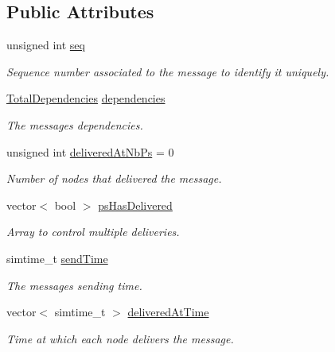\subsection*{Public Attributes}
\begin{DoxyCompactItemize}
\item 
unsigned int \hyperlink{structs__msg_a81ee20a1e6b791fdc215d88c0418e618}{seq}
\begin{DoxyCompactList}\small\item\em Sequence number associated to the message to identify it uniquely. \end{DoxyCompactList}\item 
\hyperlink{class_total_dependencies}{Total\+Dependencies} \hyperlink{structs__msg_a0683a931a64bb9e40c4da98dbd5bc836}{dependencies}
\begin{DoxyCompactList}\small\item\em The message\textquotesingle{}s dependencies. \end{DoxyCompactList}\item 
unsigned int \hyperlink{structs__msg_a88a6cac0463627f92d12acb67755186d}{delivered\+At\+Nb\+Ps} = 0
\begin{DoxyCompactList}\small\item\em Number of nodes that delivered the message. \end{DoxyCompactList}\item 
vector$<$ bool $>$ \hyperlink{structs__msg_ac9b1dd0616f30d1eadfdeda272e1b238}{ps\+Has\+Delivered}
\begin{DoxyCompactList}\small\item\em Array to control multiple deliveries. \end{DoxyCompactList}\item 
simtime\+\_\+t \hyperlink{structs__msg_abf4a4c8c468860dec56cb8d69aba81b3}{send\+Time}
\begin{DoxyCompactList}\small\item\em The message\textquotesingle{}s sending time. \end{DoxyCompactList}\item 
vector$<$ simtime\+\_\+t $>$ \hyperlink{structs__msg_a25acd8d8afeacf207f402c8362fe452c}{delivered\+At\+Time}
\begin{DoxyCompactList}\small\item\em Time at which each node delivers the message. \end{DoxyCompactList}\end{DoxyCompactItemize}


